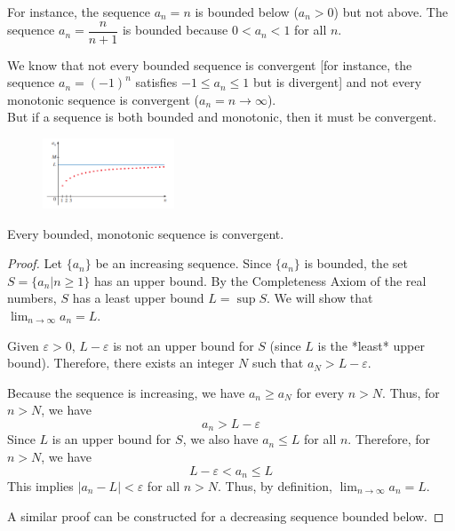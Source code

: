 \documentclass{article}
\theoremstyle{mystyle}
\begin{document}
For instance, the sequence $a_n = n$ is bounded below ($a_n > 0$) but not above. The sequence $a_n = \dfrac{n}{n+1}$ is bounded because $0 < a_n < 1$ for all $n$.

We know that not every bounded sequence is convergent [for instance, the sequence $a_n = (-1)^n$ satisfies $-1 \le a_n \le 1$ but is divergent] and not every monotonic sequence is convergent ($a_n = n \to \infty$).\\
But if a sequence is both bounded and monotonic, then it must be convergent.
\begin{figure}[htbp]
  \centering
  \includegraphics[width=0.35\textwidth]{graph71.png}
\end{figure}

\begin{tcolorbox}[colback=white, colframe=orange!80!white, title=Monotonic Sequence Theorem (Theorem 6), boxrule=0.5mm, arc=3mm]
Every bounded, monotonic sequence is convergent.
\end{tcolorbox}


\begin{proof}
Let \(\{a_n\}\) be an increasing sequence. Since \(\{a_n\}\) is bounded, the set \(S = \{a_n | n \ge 1\}\) has an upper bound. By the Completeness Axiom of the real numbers, \(S\) has a least upper bound \(L = \sup S\). We will show that \(\lim_{n\to\infty} a_n = L\).

Given \(\varepsilon > 0\), \(L-\varepsilon\) is not an upper bound for \(S\) (since \(L\) is the *least* upper bound). Therefore, there exists an integer \(N\) such that \(a_N > L - \varepsilon\).

Because the sequence is increasing, we have \(a_n \ge a_N\) for every \(n > N\). Thus, for \(n > N\), we have
\[ a_n > L - \varepsilon \]
Since \(L\) is an upper bound for \(S\), we also have \(a_n \le L\) for all \(n\). Therefore, for \(n > N\), we have
\[ L - \varepsilon < a_n \le L \]
This implies \(|a_n - L| < \varepsilon\) for all \(n > N\). Thus, by definition, \(\lim_{n\to\infty} a_n = L\).

A similar proof can be constructed for a decreasing sequence bounded below.
\end{proof}
\end{document}
